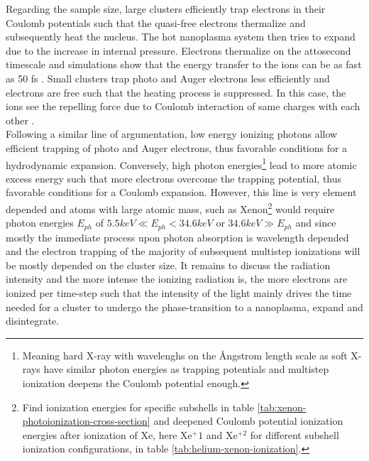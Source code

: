 Regarding the sample size, large clusters efficiently trap electrons in their Coulomb potentials such that the quasi-free electrons thermalize and subsequently heat the nucleus. The hot nanoplasma system then tries to expand due to the increase in internal pressure. Electrons thermalize on the attosecond timescale and simulations show that the energy transfer to the ions can be as fast as 50 fs \citep{Arbeiter-2010-PRA}. Small clusters trap photo and Auger electrons less efficiently and electrons are free such that the heating process is suppressed. In this case, the ions see the repelling force due to Coulomb interaction of same charges with each other \citep{Lezius-1998-PRL}.\\
Following a similar line of argumentation, low energy ionizing photons allow efficient trapping of photo and Auger electrons, thus favorable conditions for a hydrodynamic expansion. Conversely, high photon energies\footnote{Meaning hard X-ray with wavelenghs on the {\AA}ngstrom length scale as soft X-rays have similar photon energies as trapping potentials and multistep ionization deepens the Coulomb potential enough.} lead to more atomic excess energy such that more electrons overcome the trapping potential, thus favorable conditions for a Coulomb expansion. However, this line is very element depended and atoms with large atomic mass, such as Xenon\footnote{Find ionization energies for specific subshells in table \ref{tab:xenon-photoionization-cross-section} and deepened Coulomb potential ionization energies after ionization of Xe, here Xe$^+1$ and Xe$^{+2}$ for different subshell ionization configurations, in table \ref{tab:helium-xenon-ionization}.} would require photon energies $E_{ph}$ of $5.5keV\ll E_{ph} < 34.6k eV$ or $34.6keV\gg E_{ph}$ and since mostly the immediate process upon photon absorption is wavelength depended and the electron trapping of the majority of subsequent multistep ionizations will be mostly depended on the cluster size. It remains to discuss the radiation intensity and the more intense the ionizing radiation is, the more electrons are ionized per time-step such that the intensity of the light mainly drives the time needed for a cluster to undergo the phase-transition to a nanoplasma, expand and disintegrate.\\
